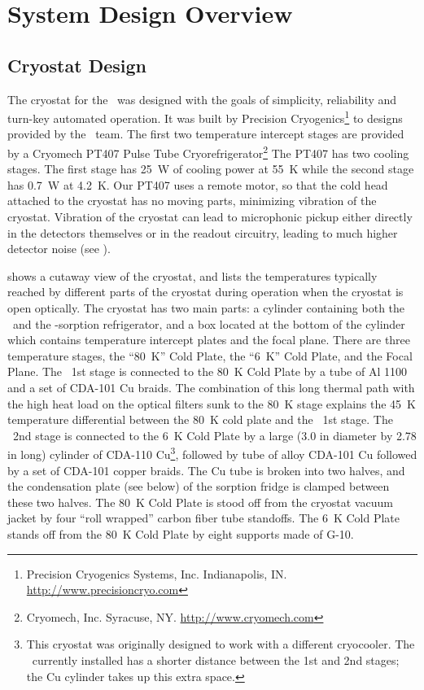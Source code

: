 \chapter{System Design Overview}\label{c:sys-design}

\section{Cryostat Design}\label{sec:ch4-cryo-design}

The cryostat for the \Imager\ was designed with the goals of simplicity, reliability and turn-key automated operation.
It was built by Precision Cryogenics\footnote{Precision Cryogenics Systems, Inc. Indianapolis, IN. \url{http://www.precisioncryo.com}} to designs provided by the \Imager\ team.
The first two temperature intercept stages are provided by a Cryomech PT407 Pulse Tube Cryorefrigerator\footnote{Cryomech, Inc. Syracuse, NY. \url{http://www.cryomech.com}}
The PT407 has two cooling stages.
The first stage has \SI{25}{\W} of cooling power at \SI{55}{\K} while the second stage has \SI{0.7}{\W} at \SI{4.2}{\K}.
Our PT407 uses a remote motor, so that the cold head attached to the cryostat has no moving parts, minimizing vibration of the cryostat.
Vibration of the cryostat can lead to microphonic pickup either directly in the detectors themselves or in the readout circuitry, leading to much higher detector noise (see ).

 shows a cutaway view of the cryostat, and  lists the temperatures typically reached by different parts of the cryostat during operation when the cryostat is open optically.
The cryostat has two main parts: a cylinder containing both the \PTC\ and the -sorption refrigerator, and a box located at the bottom of the cylinder which contains temperature intercept plates and the focal plane.
There are three temperature stages, the ``\SI{80}{\K}'' Cold Plate, the ``\SI{6}{\K}'' Cold Plate, and the Focal Plane.
The \PTC\ 1st stage is connected to the \SI{80}{\K} Cold Plate by a tube of Al 1100 and a set of CDA-101 Cu braids.
The combination of this long thermal path with the high heat load on the optical filters sunk to the \SI{80}{\K} stage explains the \SI{45}{\K} temperature differential between the \SI{80}{\K} cold plate and the \PTC\ 1st stage.
The \PTC\ 2nd stage is connected to the \SI{6}{K} Cold Plate by a large (3.0 in diameter by 2.78 in long) cylinder of CDA-110 Cu\footnote{This cryostat was originally designed to work with a different cryocooler. The \PTC\ currently installed has a shorter distance between the 1st and 2nd stages; the Cu cylinder takes up this extra space.}, followed by tube of alloy CDA-101 Cu followed by a set of  CDA-101 copper braids.
The Cu tube is broken into two halves, and the condensation plate (see below) of the sorption fridge is clamped between these two halves. The \SI{80}{\K} Cold Plate is stood off from the cryostat vacuum jacket by four ``roll wrapped'' carbon fiber tube standoffs. The \SI{6}{\K} Cold Plate stands off from the \SI{80}{\K} Cold Plate by eight supports made of G-10.

